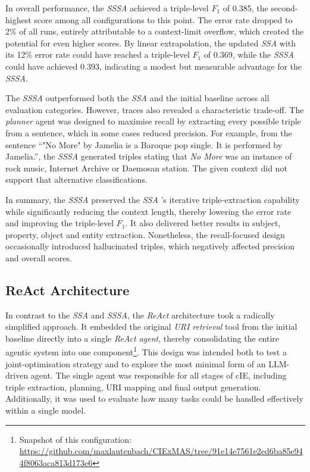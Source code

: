 \documentclass[a4paper,oneside,bibliography=totoc]{scrbook}
\begin{document}
In overall performance, the \textit{\ac{SSSA}} achieved a triple-level $F_{1}$ of 0.385, the second-highest score among all configurations to this point. The error rate dropped to 2\% of all runs, entirely attributable to a context-limit overflow, which created the potential for even higher scores. By linear extrapolation, the updated \textit{\ac{SSA}} with its 12\% error rate could have reached a triple-level $F_{1}$ of 0.369, while the \textit{\ac{SSSA}} could have achieved 0.393, indicating a modest but measurable advantage for the \textit{\ac{SSSA}}.

The \textit{\ac{SSSA}} outperformed both the \textit{\ac{SSA}} and the initial baseline across all evaluation categories. However, traces also revealed a characteristic trade-off. The \textit{planner} agent was designed to maximise recall by extracting every possible triple from a sentence, which in some cases reduced precision. For example, from the sentence \enquote{"No More" by Jamelia is a Baroque pop single. It is performed by Jamelia.}, the \textit{\ac{SSSA}} generated triples stating that \textit{No More} was an instance of rock music, Internet Archive or Daemosan station. The given context did not support that alternative classifications.

In summary, the \textit{\ac{SSSA}} preserved the \textit{\ac{SSA}} 's iterative triple-extraction capability while significantly reducing the context length, thereby lowering the error rate and improving the triple-level $F_{1}$. It also delivered better results in subject, property, object and entity extraction. Nonetheless, the recall-focused design occasionally introduced hallucinated triples, which negatively affected precision and overall scores.

\subsection{ReAct Architecture}
\label{subsec:one_agent_architecture_tool_usage}

In contrast to the \textit{\ac{SSA}} and \textit{\ac{SSSA}}, the \textit{\ac{ReAct}} architecture took a radically simplified approach. It embedded the original \textit{\ac{URI} retrieval} tool from the initial baseline directly into a single \textit{\ac{ReAct} agent}, thereby consolidating the entire agentic system into one component\footnote{Snapshot of this configuration: \url{https://github.com/maxlautenbach/CIExMAS/tree/91e14e7561e2ed6ba85e944f8063aca813d173e6}}. This design was intended both to test a joint-optimisation strategy and to explore the most minimal form of an \ac{LLM}-driven agent. The single agent was responsible for all stages of \ac{cIE}, including triple extraction, planning, \ac{URI} mapping and final output generation. Additionally, it was used to evaluate how many tasks could be handled effectively within a single model.
\end{document}
